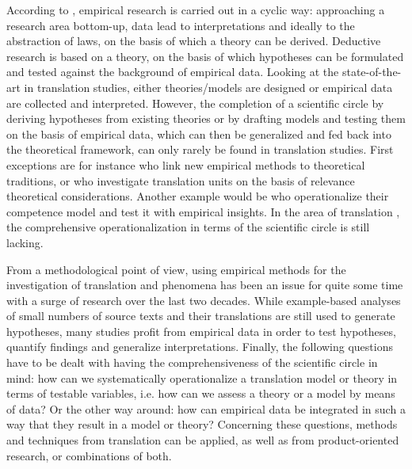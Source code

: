 
\begin{refsection}

According to \citet{Black1999}, empirical research is carried out in a cyclic way: approaching a research area bottom-up, data lead to interpretations and ideally to the abstraction of laws, on the basis of which a theory can be derived. Deductive research is based on a theory, on the basis of which hypotheses can be formulated and tested against the background of empirical data. Looking at the state-of-the-art in translation studies, either theories/models are designed or empirical data are collected and interpreted. However, the completion of a scientific circle by deriving hypotheses from existing theories or by drafting models and testing them on the basis of empirical data, which can then be generalized and fed back into the theoretical framework, can only rarely be found in translation studies. First exceptions are for instance \citet{deSutter2017} who link new empirical methods to theoretical traditions, or \citet{Alves2013} who investigate translation units on the basis of relevance theoretical considerations. Another example would be \citet{PACTE2014} who operationalize their competence model and test it with empirical insights. In the area of translation , the comprehensive operationalization in terms of the scientific circle is still lacking. 

From a methodological point of view, using empirical methods for the investigation of translation and  phenomena has been an issue for quite some time with a surge of research over the last two decades. While example-based analyses of small numbers of source texts and their translations are still used to generate hypotheses, many studies profit from empirical data in order to test hypotheses, quantify findings and generalize interpretations. Finally, the following questions have to be dealt with having the comprehensiveness of the scientific circle in mind: how can we systematically operationalize a translation model or theory in terms of testable variables, i.e. how can we assess a theory or a model by means of data? Or the other way around: how can empirical data be integrated in such a way that they result in a model or theory? Concerning these questions, methods and techniques from translation  can be applied, as well as from product-oriented research, or combinations of both. 


\end{refsection}
